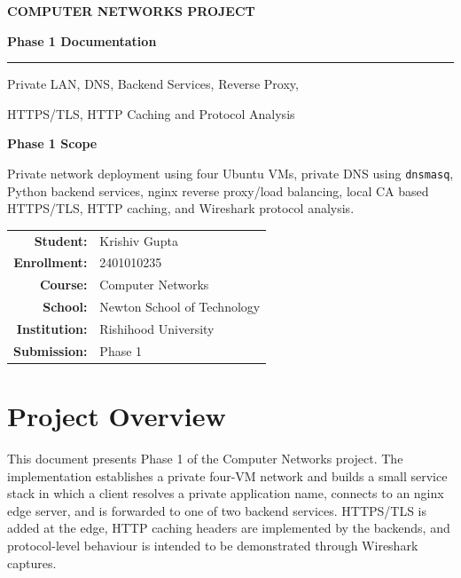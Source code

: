 \documentclass[12pt,a4paper]{article}
\begin{document}
\hypersetup{pageanchor=false}
\begin{titlepage}
\centering
\vspace*{2.2cm}
{\Large\bfseries COMPUTER NETWORKS PROJECT\par}
\vspace{0.7cm}
{\Huge\bfseries Phase 1 Documentation\par}
\vspace{1.0cm}
\rule{0.72\textwidth}{1pt}\par
\vspace{0.7cm}
{\large Private LAN, DNS, Backend Services, Reverse Proxy,\par}
{\large HTTPS/TLS, HTTP Caching and Protocol Analysis\par}
\vspace{1.5cm}

\begin{tcolorbox}[width=0.78\textwidth,colback=lightblue,colframe=navy,boxrule=0.7pt]
\centering
\textbf{Phase 1 Scope}\par
Private network deployment using four Ubuntu VMs, private DNS using \texttt{dnsmasq}, Python backend services, nginx reverse proxy/load balancing, local CA based HTTPS/TLS, HTTP caching, and Wireshark protocol analysis.
\end{tcolorbox}

\vfill
\begin{tabular}{rl}
\textbf{Student:} & Krishiv Gupta\\[8pt]
\textbf{Enrollment:} & 2401010235\\[8pt]
\textbf{Course:} & Computer Networks\\[8pt]
\textbf{School:} & Newton School of Technology\\[8pt]
\textbf{Institution:} & Rishihood University\\[8pt]
\textbf{Submission:} & Phase 1\\[8pt]
\end{tabular}
\vspace{1cm}

\end{titlepage}
\hypersetup{pageanchor=true}

\tableofcontents
\newpage

\section{Project Overview}
This document presents Phase 1 of the Computer Networks project. The implementation establishes a private four-VM network and builds a small service stack in which a client resolves a private application name, connects to an nginx edge server, and is forwarded to one of two backend services. HTTPS/TLS is added at the edge, HTTP caching headers are implemented by the backends, and protocol-level behaviour is intended to be demonstrated through Wireshark captures.
\end{document}

